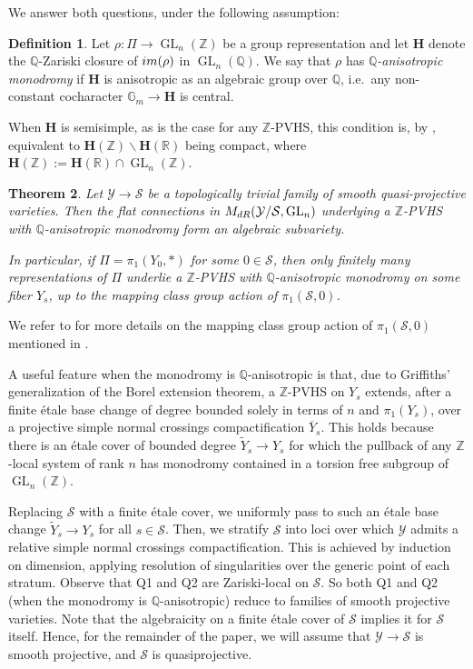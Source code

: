 \documentclass[10pt,letterpaper,english,reqno]{amsart}
\numberwithin{equation}{subsection}
\newcommand\cS{{\mathcal S}}
\newcommand\cY{{\mathcal Y}}
\newcommand\Q{{\mathbb Q}}
\newcommand\R{{\mathbb R}}
\newcommand\Z{{\mathbb Z}}
\newcommand\wY{{\widetilde Y}}
\newcommand\bfH{{\mathbf H}}
\DeclareMathOperator{\GL}{GL}
\newtheorem{theorem}{Theorem}[section]
\theoremstyle{definition}
\newtheorem{definition}[theorem]{Definition}
\begin{document}
We answer both questions, under the following assumption:

\begin{definition} 
Let $\rho\colon \Pi\to \GL_n(\Z)$ be a group representation and let $\bfH$ denote
the $\Q$-Zariski closure of ${\rm im}(\rho)$ in $\GL_n(\Q)$. We say that $\rho$ has {\it $\Q$-anisotropic monodromy} if $\bfH$ is anisotropic as an algebraic group over $\Q$, i.e.~any non-constant cocharacter $\mathbb{G}_m\to \bfH$ is central.

\end{definition}

When $\bfH$ is semisimple, as is the case for any $\Z$-PVHS, this condition is, by \cite[Thm.~11.8]{Borel-Harish-Chandra}, equivalent to $\bfH(\Z)\backslash \bfH(\R)$ being compact, where $\bfH(\Z):=\bfH(\R)\cap \GL_n(\Z)$.

\begin{theorem}\label{main} 
Let $\cY\to \cS$ be a topologically trivial family of smooth quasi-projective varieties. Then the flat connections in $M_{\rm dR}(\cY/\cS,\GL_n)$ underlying a $\Z$-PVHS with $\Q$-anisotropic monodromy form an algebraic subvariety. \vspace{2pt}

In particular, if $\Pi = \pi_1(Y_0,*)$ for some
$0\in \cS$, then only finitely many
representations of $\Pi$ underlie a $\Z$-PVHS with $\Q$-anisotropic monodromy on some fiber 
$Y_s$, up to the mapping class group action of $\pi_1(\cS,0)$.
\end{theorem}

We refer to  for more details on the mapping class group action of $\pi_1(\cS,0)$ mentioned in . 

A useful feature when the monodromy is 
$\Q$-anisotropic is that, due to Griffiths' 
generalization of the Borel extension theorem,
a $\Z$-PVHS on $Y_s$ extends, after a finite \'etale base change
of degree bounded solely in 
terms of $n$ and $\pi_1(Y_s)$,
over a projective simple 
normal crossings compactification $\overline{Y}_s$. This holds 
because there is
an \'etale cover of bounded degree 
$\widetilde{Y}_s\to Y_s$ for which
the pullback of any $\Z$-local system of
rank $n$ has monodromy contained
in a torsion free subgroup of $\GL_n(\Z)$.

Replacing $\cS$ with
a finite \'etale cover, we uniformly
pass to such an \'etale base change 
$\wY_s\to Y_s$ 
for all $s\in \cS$.
Then, we stratify $\cS$ 
into loci over which $\cY$
admits a relative simple normal crossings compactification. 
This is achieved by induction on dimension,
applying resolution of singularities over the 
generic point of each stratum. 
Observe
that Q1 and Q2 are Zariski-local on $\cS$.
So both Q1 and Q2 (when the monodromy is $\Q$-anisotropic)
reduce to families of smooth projective varieties. Note that the algebraicity
on a finite \'etale cover of $\cS$ implies
it for $\cS$ itself. Hence,
for the remainder of the paper, we will assume that
$\cY\to \cS$ is smooth projective, and
$\cS$ is quasiprojective.
\end{document}
